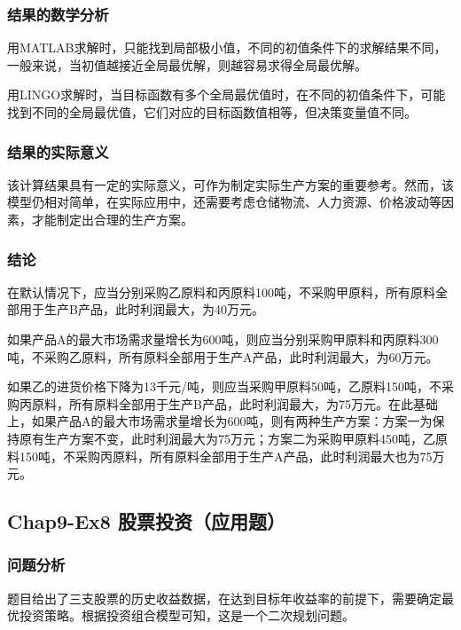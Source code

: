 \documentclass[12pt,a4paper]{article}
\begin{document}
\subsubsection{结果的数学分析}

用MATLAB求解时，只能找到局部极小值，不同的初值条件下的求解结果不同，一般来说，当初值越接近全局最优解，则越容易求得全局最优解。

用LINGO求解时，当目标函数有多个全局最优值时，在不同的初值条件下，可能找到不同的全局最优值，它们对应的目标函数值相等，但决策变量值不同。

\subsubsection{结果的实际意义}

该计算结果具有一定的实际意义，可作为制定实际生产方案的重要参考。然而，该模型仍相对简单，在实际应用中，还需要考虑仓储物流、人力资源、价格波动等因素，才能制定出合理的生产方案。

\subsubsection{结论}

在默认情况下，应当分别采购乙原料和丙原料100吨，不采购甲原料，所有原料全部用于生产B产品，此时利润最大，为40万元。

如果产品A的最大市场需求量增长为600吨，则应当分别采购甲原料和丙原料300吨，不采购乙原料，所有原料全部用于生产A产品，此时利润最大，为60万元。

如果乙的进货价格下降为13千元/吨，则应当采购甲原料50吨，乙原料150吨，不采购丙原料，所有原料全部用于生产B产品，此时利润最大，为75万元。在此基础上，如果产品A的最大市场需求量增长为600吨，则有两种生产方案：方案一为保持原有生产方案不变，此时利润最大为75万元；方案二为采购甲原料450吨，乙原料150吨，不采购丙原料，所有原料全部用于生产A产品，此时利润最大也为75万元。

\subsection{Chap9-Ex8 股票投资（应用题）}

\subsubsection{问题分析}

题目给出了三支股票的历史收益数据，在达到目标年收益率的前提下，需要确定最优投资策略。根据投资组合模型可知，这是一个二次规划问题。
\end{document}
